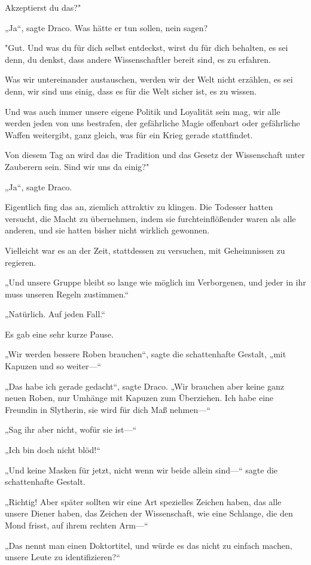 {Akzeptierst du das?"

„Ja“, sagte Draco. Was hätte er tun sollen, nein sagen?

"Gut. Und was du für dich selbst entdeckst, wirst du für dich behalten, es sei denn, du denkst, dass andere Wissenschaftler bereit sind, es zu erfahren.

Was wir untereinander austauschen, werden wir der Welt nicht erzählen, es sei denn, wir sind uns einig, dass es für die Welt sicher ist, es zu wissen.

Und was auch immer unsere eigene Politik und Loyalität sein mag, wir alle werden jeden von uns bestrafen, der gefährliche Magie offenbart oder gefährliche Waffen weitergibt, ganz gleich, was für ein Krieg gerade stattfindet.

Von diesem Tag an wird das die Tradition und das Gesetz der Wissenschaft unter Zauberern sein. Sind wir uns da einig?"

„Ja“, sagte Draco.

Eigentlich fing das an, ziemlich attraktiv zu klingen. Die Todesser hatten versucht, die Macht zu übernehmen, indem sie furchteinflößender waren als alle anderen, und sie hatten bisher nicht wirklich gewonnen.

Vielleicht war es an der Zeit, stattdessen zu versuchen, mit Geheimnissen zu regieren.

„Und unsere Gruppe bleibt so lange wie möglich im Verborgenen, und jeder in ihr muss unseren Regeln zustimmen.“

„Natürlich. Auf jeden Fall.“

Es gab eine sehr kurze Pause.

„Wir werden bessere Roben brauchen“, sagte die schattenhafte Gestalt, „mit Kapuzen und so weiter—“

„Das habe ich gerade gedacht“, sagte Draco. „Wir brauchen aber keine ganz neuen Roben, nur Umhänge mit Kapuzen zum Überziehen. Ich habe eine Freundin in Slytherin, sie wird für dich Maß nehmen—“

„Sag ihr aber nicht, wofür sie ist—“

„Ich bin doch nicht blöd!“

„Und keine Masken für jetzt, nicht wenn wir beide allein sind—“ sagte die schattenhafte Gestalt.

„Richtig! Aber später sollten wir eine Art spezielles Zeichen haben, das alle unsere Diener haben, das Zeichen der Wissenschaft, wie eine Schlange, die den Mond frisst, auf ihrem rechten Arm—“

„Das nennt man einen Doktortitel, und würde es das nicht zu einfach machen, unsere Leute zu identifizieren?“

}
